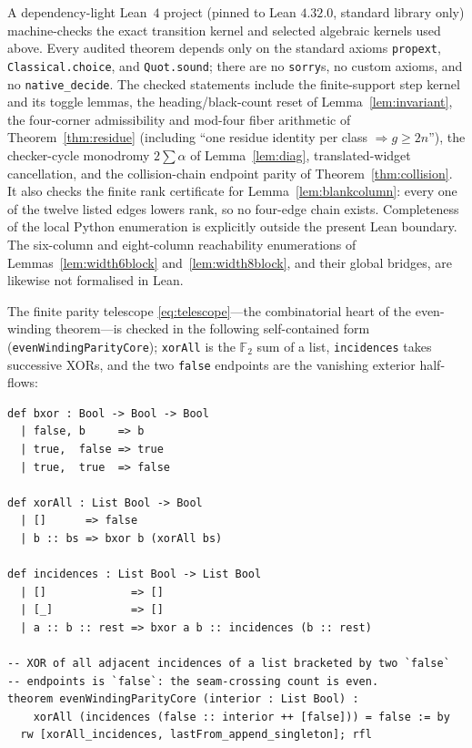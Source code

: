 \documentclass[11pt,letterpaper]{article}
\theoremstyle{plain}
\theoremstyle{definition}
\newcommand{\F}{\mathbb{F}}
\newcommand{\growth}{g}
\begin{document}
\begin{NoHyper}
A dependency-light Lean~$4$ project (pinned to Lean $4.32.0$, standard library only)
machine-checks the exact transition kernel and selected algebraic kernels used above.
Every audited theorem depends only on the standard axioms
\texttt{propext}, \texttt{Classical.choice}, and \texttt{Quot.sound}; there are no
\texttt{sorry}s, no custom axioms, and no \texttt{native\_decide}. The checked
statements include the finite-support step kernel and its toggle lemmas, the
heading/black-count reset of Lemma~\ref{lem:invariant}, the four-corner admissibility
and mod-four fiber arithmetic of Theorem~\ref{thm:residue} (including
``one residue identity per class $\Rightarrow\growth\ge2n$''), the checker-cycle
monodromy $2\sum\alpha$ of Lemma~\ref{lem:diag}, translated-widget cancellation, and
the collision-chain endpoint parity of Theorem~\ref{thm:collision}.  It also checks
the finite rank certificate for Lemma~\ref{lem:blankcolumn}: every one of the twelve
listed edges lowers rank, so no four-edge chain exists.  Completeness of the local
Python enumeration is explicitly outside the present Lean boundary.  The
six-column and eight-column reachability enumerations of
Lemmas~\ref{lem:width6block} and~\ref{lem:width8block}, and their global bridges, are
likewise not formalised in Lean.

The finite parity telescope \eqref{eq:telescope}---the combinatorial heart of the
even-winding theorem---is checked in the following self-contained form
(\texttt{evenWindingParityCore}); \texttt{xorAll} is the $\F_2$ sum of a list,
\texttt{incidences} takes successive XORs, and the two \texttt{false} endpoints are
the vanishing exterior half-flows:

\begin{lstlisting}[style=lean]
def bxor : Bool -> Bool -> Bool
  | false, b     => b
  | true,  false => true
  | true,  true  => false

def xorAll : List Bool -> Bool
  | []      => false
  | b :: bs => bxor b (xorAll bs)

def incidences : List Bool -> List Bool
  | []             => []
  | [_]            => []
  | a :: b :: rest => bxor a b :: incidences (b :: rest)

-- XOR of all adjacent incidences of a list bracketed by two `false`
-- endpoints is `false`: the seam-crossing count is even.
theorem evenWindingParityCore (interior : List Bool) :
    xorAll (incidences (false :: interior ++ [false])) = false := by
  rw [xorAll_incidences, lastFrom_append_singleton]; rfl
\end{lstlisting}


\end{NoHyper}
\end{document}
